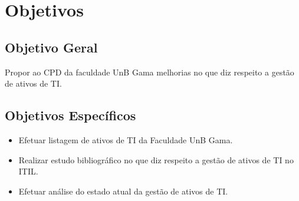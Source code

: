 \section{Objetivos}

\subsection{Objetivo Geral}
Propor ao CPD da faculdade UnB Gama melhorias no que diz respeito a gestão de ativos de TI.

\subsection{Objetivos Específicos}
\begin{itemize}
\item Efetuar listagem de ativos de TI da Faculdade UnB Gama.
\item Realizar estudo bibliográfico no que diz respeito a gestão de ativos de TI no ITIL.
\item Efetuar análise do estado atual da gestão de ativos de TI.
\end{itemize}